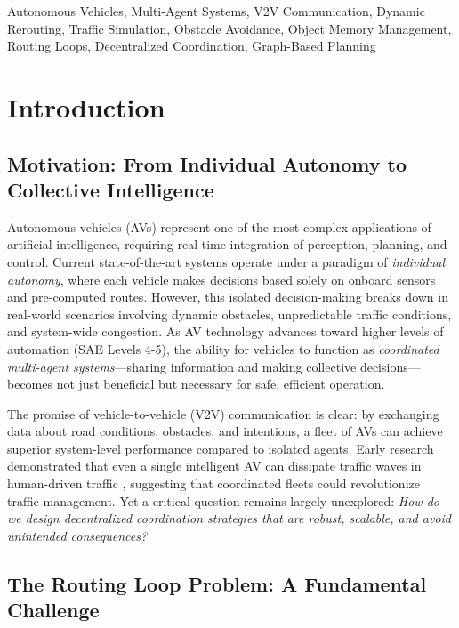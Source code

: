 \documentclass[conference]{IEEEtran}
\begin{document}
\begin{IEEEkeywords}
Autonomous Vehicles, Multi-Agent Systems, V2V Communication, Dynamic Rerouting, Traffic Simulation, Obstacle Avoidance, Object Memory Management, Routing Loops, Decentralized Coordination, Graph-Based Planning
\end{IEEEkeywords}

\section{Introduction}

\subsection{Motivation: From Individual Autonomy to Collective Intelligence}

Autonomous vehicles (AVs) represent one of the most complex applications of artificial intelligence, requiring real-time integration of perception, planning, and control. Current state-of-the-art systems operate under a paradigm of \textit{individual autonomy}, where each vehicle makes decisions based solely on onboard sensors and pre-computed routes. However, this isolated decision-making breaks down in real-world scenarios involving dynamic obstacles, unpredictable traffic conditions, and system-wide congestion. As AV technology advances toward higher levels of automation (SAE Levels 4-5), the ability for vehicles to function as \textit{coordinated multi-agent systems}—sharing information and making collective decisions—becomes not just beneficial but necessary for safe, efficient operation.

The promise of vehicle-to-vehicle (V2V) communication is clear: by exchanging data about road conditions, obstacles, and intentions, a fleet of AVs can achieve superior system-level performance compared to isolated agents. Early research demonstrated that even a single intelligent AV can dissipate traffic waves in human-driven traffic \cite{stern2018dissipation}, suggesting that coordinated fleets could revolutionize traffic management. Yet a critical question remains largely unexplored: \textit{How do we design decentralized coordination strategies that are robust, scalable, and avoid unintended consequences?}

\subsection{The Routing Loop Problem: A Fundamental Challenge}
\end{document}

